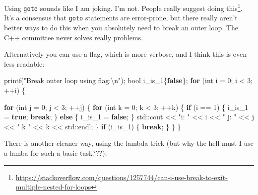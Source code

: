 \documentclass[
]{book}
\newenvironment{Shaded}{\begin{snugshade}}{\end{snugshade}}
\newcommand{\BuiltInTok}[1]{#1}
\newcommand{\ControlFlowTok}[1]{\textcolor[rgb]{0.13,0.29,0.53}{\textbf{#1}}}
\newcommand{\DataTypeTok}[1]{\textcolor[rgb]{0.13,0.29,0.53}{#1}}
\newcommand{\DecValTok}[1]{\textcolor[rgb]{0.00,0.00,0.81}{#1}}
\newcommand{\KeywordTok}[1]{\textcolor[rgb]{0.13,0.29,0.53}{\textbf{#1}}}
\newcommand{\NormalTok}[1]{#1}
\newcommand{\SpecialCharTok}[1]{\textcolor[rgb]{0.00,0.00,0.00}{#1}}
\newcommand{\StringTok}[1]{\textcolor[rgb]{0.31,0.60,0.02}{#1}}
\begin{document}
Using \texttt{goto} sounds like I am joking. I'm not. People really suggest doing this\footnote{\url{https://stackoverflow.com/questions/1257744/can-i-use-break-to-exit-multiple-nested-for-loops}}. It's a consensus that \texttt{goto} statements are error-prone, but there really aren't better ways to do this when you absolutely need to break an outer loop. The C++ committee never solves really problems.

Alternatively you can use a flag, which is more verbose, and I think this is even less readable:

\begin{Shaded}
\begin{Highlighting}[]
\NormalTok{printf(}\StringTok{"Break outer loop using flag:}\SpecialCharTok{\textbackslash{}n}\StringTok{"}\NormalTok{);}
\DataTypeTok{bool}\NormalTok{ i\_is\_1\{}\KeywordTok{false}\NormalTok{\};}
\ControlFlowTok{for}\NormalTok{ (}\DataTypeTok{int}\NormalTok{ i = }\DecValTok{0}\NormalTok{; i \textless{} }\DecValTok{3}\NormalTok{; ++i)}
\NormalTok{\{}

    \ControlFlowTok{for}\NormalTok{ (}\DataTypeTok{int}\NormalTok{ j = }\DecValTok{0}\NormalTok{; j \textless{} }\DecValTok{3}\NormalTok{; ++j)}
\NormalTok{    \{}
        \ControlFlowTok{for}\NormalTok{ (}\DataTypeTok{int}\NormalTok{ k = }\DecValTok{0}\NormalTok{; k \textless{} }\DecValTok{3}\NormalTok{; ++k)}
\NormalTok{        \{}
            \ControlFlowTok{if}\NormalTok{ (i == }\DecValTok{1}\NormalTok{)}
\NormalTok{            \{}
\NormalTok{                i\_is\_1 = }\KeywordTok{true}\NormalTok{;}
                \ControlFlowTok{break}\NormalTok{;}
\NormalTok{            \}}
            \ControlFlowTok{else}
\NormalTok{            \{}
\NormalTok{                i\_is\_1 = }\KeywordTok{false}\NormalTok{;}
\NormalTok{            \}}
            \BuiltInTok{std::}\NormalTok{cout \textless{}\textless{} }\StringTok{"i: "}\NormalTok{ \textless{}\textless{} i \textless{}\textless{} }\StringTok{" j: "}\NormalTok{ \textless{}\textless{} j \textless{}\textless{} }\StringTok{" k "}\NormalTok{ \textless{}\textless{} k \textless{}\textless{} }\BuiltInTok{std::}\NormalTok{endl;}
\NormalTok{        \}}
        \ControlFlowTok{if}\NormalTok{ (i\_is\_1)}
\NormalTok{        \{}
            \ControlFlowTok{break}\NormalTok{;}
\NormalTok{        \}}
\NormalTok{    \}}
\NormalTok{\}}
\end{Highlighting}
\end{Shaded}

There is another cleaner way, using the lambda trick (but why the hell must I use a lamba for such a basic task???):
\end{document}
